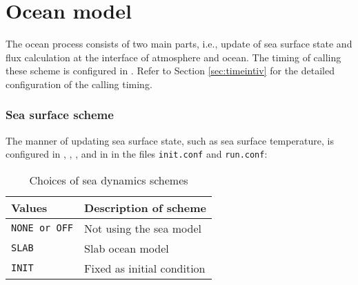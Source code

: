 \section{Ocean model} \label{sec:basic_usel_ocean}
The ocean process consists of two main parts, i.e., update of sea surface state and flux calculation at the interface of atmosphere and ocean. The timing of calling these scheme is configured in . Refer to Section \ref{sec:timeintiv} for the detailed configuration of the calling timing.

\subsubsection{Sea surface scheme}
The manner of updating sea surface state, such as sea surface temperature, is configured in , , , and  in  in the files \verb|init.conf| and \verb|run.conf|:

\begin{table}[h]
\begin{center}
  \caption{Choices of sea dynamics schemes}
  \label{tab:nml_ocean_dyn}
  \begin{tabularx}{150mm}{lX} \hline
    \rowcolor[gray]{0.9}  Values & Description of scheme \\ \hline
      \verb|NONE or OFF| & Not using the sea model \\
      \verb|SLAB|        & Slab ocean model \\
      \verb|INIT|        & Fixed as initial condition \\
    \hline
  \end{tabularx}
\end{center}
\end{table}

